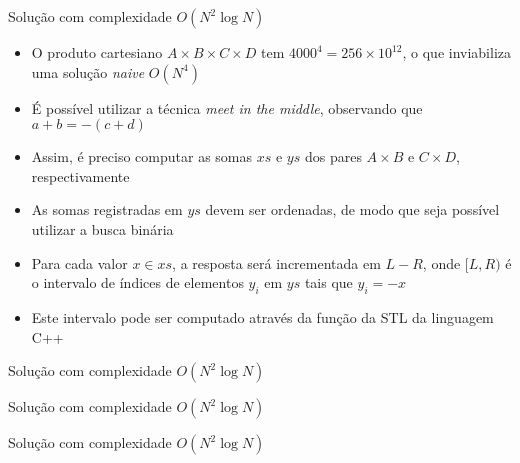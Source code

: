 \begin{frame}[fragile]{Solução com complexidade $O(N^2\log N)$}

    \begin{itemize}
        \item O produto cartesiano $A\times B\times C\times D$ tem  $4000^4 = 256 \times 10^{12}$,
            o que inviabiliza uma solução \textit{naive} $O(N^4)$

        \item É possível utilizar a técnica \textit{meet in the middle}, observando que
            $a + b = -(c + d)$

        \item Assim, é preciso computar as somas $xs$ e $ys$ dos pares $A\times B$ e $C\times D$,
            respectivamente

        \item As somas registradas em $ys$ devem ser ordenadas, de modo que seja possível 
            utilizar a busca binária
            
        \item Para cada valor $x\in xs$, a resposta será incrementada em $L - R$, onde 
            $[L, R)$ é o intervalo de índices de elementos $y_i$ em $ys$ tais que $y_i = -x$

        \item Este intervalo pode ser computado através da função 
            da STL da linguagem C++

   \end{itemize}

\end{frame}

\begin{frame}[fragile]{Solução com complexidade $O(N^2\log N)$}
\end{frame}

\begin{frame}[fragile]{Solução com complexidade $O(N^2\log N)$}
\end{frame}

\begin{frame}[fragile]{Solução com complexidade $O(N^2\log N)$}
\end{frame}

